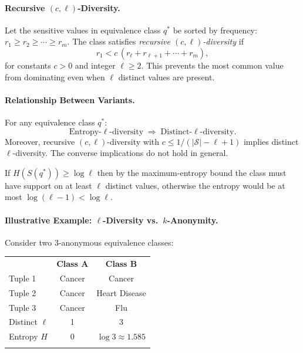 \paragraph{Recursive $(c,\ell)$-Diversity.}
Let the sensitive values in equivalence class $q^*$ be sorted by frequency: $r_1 \geq r_2 \geq \cdots \geq r_m$. The class satisfies \emph{recursive $(c,\ell)$-diversity} if
\[
  r_1 < c\,(r_\ell + r_{\ell+1} + \cdots + r_m),
\]
for constants $c > 0$ and integer $\ell \geq 2$. This prevents the most common value from dominating even when $\ell$ distinct values are present.

\paragraph{Relationship Between Variants.}

For any equivalence class $q^*$:
\[
  \text{Entropy-}\ell\text{-diversity}
  \;\Rightarrow\;
  \text{Distinct-}\ell\text{-diversity}.
\]
Moreover, recursive $(c, \ell)$-diversity with $c \leq 1/(|\mathcal{S}|-\ell+1)$ implies distinct $\ell$-diversity. The converse implications do not hold in general.

If $H(S(q^*)) \geq \log\ell$ then by the maximum-entropy bound the class must have support on at least $\ell$ distinct values, otherwise the entropy would be at most $\log(\ell - 1) < \log \ell$.

\paragraph{Illustrative Example: $\ell$-Diversity vs.\ $k$-Anonymity.}

Consider two 3-anonymous equivalence classes:

\begin{center}
\begin{tabular}{p{2cm}cc}
\hline\noalign{\smallskip}
 & \textbf{Class A} & \textbf{Class B}\\
\noalign{\smallskip}\svhline\noalign{\smallskip}
Tuple 1 & Cancer & Cancer\\
Tuple 2 & Cancer & Heart Disease\\
Tuple 3 & Cancer & Flu\\
\noalign{\smallskip}\hline\noalign{\smallskip}
Distinct $\ell$ & 1 & 3\\
Entropy $H$     & 0 & $\log 3 \approx 1.585$\\
\noalign{\smallskip}\hline\noalign{\smallskip}
\end{tabular}
\end{center}

